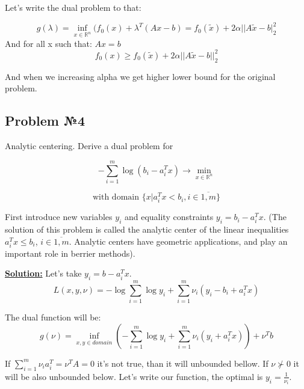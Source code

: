 Let's write the dual problem to that:

\begin{equation*}
    g(\lambda) = \inf_{x \in \mathds{R}^n} (f_0(x) + \lambda^T(Ax - b) = f_0(\widetilde{x}) + 2\alpha ||A\widetilde{x} - b|_2^2
\end{equation*}
And for all x such that: $Ax = b$
\begin{equation*}
    f_0(x) \geq f_0(\widetilde{x}) + 2\alpha ||A\widetilde{x} - b||_2^2
\end{equation*}

And when we increasing alpha we get higher lower bound for the original problem.

\subsection{Problem №4}
Analytic centering. Derive a dual problem for

\begin{equation*}
- \sum\limits_{i=1}^m \log (b_i - a_i^Tx) \rightarrow \min_{x \in \mathds{R}^n}
\end{equation*}

\begin{equation*}
    \text{with domain } \{x | a_i^T x < b_i, i \in \overline{1, m} \}
\end{equation*}

First introduce new variables $y_i$ and equality constraints $y_i = b_i - a_i^Tx$. (The solution of this problem is called the analytic center of the linear inequalities $a_i^Tx \leq b_i$, $i \in \overline{1, m}$. Analytic centers have geometric applications, and play an important role in berrier methods).

\underline{\textbf{Solution:}}
Let's take $y_i = b - a_i^Tx$.
\begin{equation*}
    L(x, y, \nu) = - \log \sum\limits_{i=1}^m \log y_i + \sum\limits_{i=1}^m\nu_i(y_i - b_i + a_i^Tx)
\end{equation*}

The dual function will be:
\begin{equation*}
    g(\nu) = \inf_{x, y \in domain} ( - \sum\limits_{i=1}^m \log y_i + \sum\limits_{i=1}^m\nu_i(y_i + a_i^Tx)) + \nu^Tb
\end{equation*}

If $\sum\limits_{i=1}^m \nu_i a_i^T = \nu^TA = 0$ it's not true, than it will unbounded bellow. If $\nu \not \succ 0$ it will be also unbounded below. Let's write our function, the optimal is $y_i = \frac{1}{\nu_i}$.

